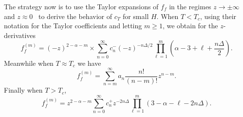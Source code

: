 The strategy now is to use the Taylor expansions of $f_f$ in the regimes
$z\to\pm\infty$ and $z\approx 0$~\cite{Engels:2011km} to derive the
behavior of $c_T$ for small $H$. When $T<T_c$, using their
notation for the Taylor coefficients and letting $m\geq1$,
we obtain for the $z$-derivatives
\begin{equation}
    f_f^{(m)}=(-z)^{2-\alpha-m}
    \times\sum_{n=0}^\infty c_n^-(-z)^{-n\Delta/2}\prod_{\ell=1}^m\left(\alpha-3+\ell+\frac{n\Delta}{2}\right).
\end{equation}
Meanwhile when $T\approx T_c$ we have 
\begin{equation}
    f_f^{(m)}=\sum_{n=m}^\infty a_n\frac{n!}{(n-m)!}z^{n-m}.
\end{equation}
Finally when $T>T_c$,
\begin{equation}
    f_f^{(m)}=z^{2-\alpha-m}\sum_{n=0}^\infty c_n^+z^{-2n\Delta}\prod_{\ell=1}^m\left(3-\alpha-\ell-2n\Delta\right).
\end{equation}





